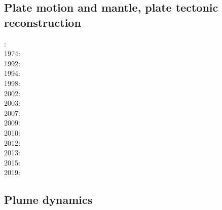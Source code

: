 {\scriptsize
\noindent
\cite{hack90}
\cite{hack91}
\cite{mokd00}
\cite{agzf14}
\cite{duay16}
}

\subsection{Plate motion and mantle, plate tectonic reconstruction}

{\scriptsize
{}: \cite{mcse73}\\
1974: \cite{sosl74}\\
1992: \cite{zieg92a}\\
1994: \cite{guto94}\\
1998: \cite{zhgm98}\\
2002: \cite{stoc02}\\
2003: \cite{evan03}\cite{reta03}\\
2007: \cite{zhzl07}\\
2009: \cite{lizh09}\cite{vasv09}\\
2010: \cite{stto10}\\
2012: \cite{huss12}\cite{gutz12}\cite{qumm12}\cite{holr12}\\
2013: \cite{mosq13}\cite{cost13}\\
2015: \cite{yoha15}\\
2019: \cite{tewg19}
}

\subsection{Plume dynamics}

